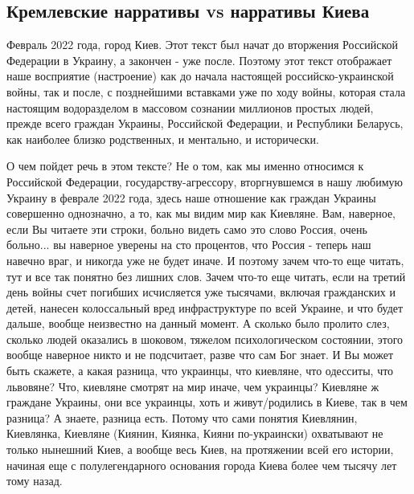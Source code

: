  
 
 
 
 

\subsection{Кремлевские нарративы vs нарративы Киева}

Февраль 2022 года, город Киев. Этот текст был начат до вторжения Российской
Федерации в Украину, а закончен - уже после. Поэтому этот текст отображает наше
восприятие (настроение) как до начала настоящей российско-украинской войны, так
и после, с позднейшими вставками уже по ходу войны, которая стала настоящим
водоразделом в массовом сознании миллионов простых людей, прежде всего граждан
Украины, Российской Федерации, и Республики Беларусь, как наиболее близко
родственных, и ментально, и исторически.

О чем пойдет речь в этом тексте? Не о том, как мы именно относимся к Российской
Федерации, государству-агрессору, вторгнувшемся в нашу любимую Украину в феврале 2022 года,
здесь наше отношение как граждан Украины совершенно однозначно, а то, как мы
видим мир как Киевляне. Вам, наверное, если Вы читаете эти строки, больно
видеть само это слово Россия, очень больно... вы наверное уверены на сто
процентов, что Россия - теперь наш навечно враг, и никогда уже не будет иначе.
И поэтому зачем что-то еще читать, тут и все так понятно без лишних слов. Зачем
что-то еще читать, если на третий день войны счет погибших исчисляется уже
тысячами, включая гражданских и детей, нанесен колоссальный вред инфраструктуре
по всей Украине, и что будет дальше, вообще неизвестно на данный момент.  А
сколько было пролито слез, сколько людей оказались в шоковом, тяжелом
психологическом состоянии, этого вообще наверное никто и не подсчитает, разве
что сам Бог знает. И Вы может быть скажете, а какая разница, что украинцы, что
киевляне, что одесситы, что львовяне? Что, киевляне смотрят на мир иначе, чем
украинцы?  Киевляне ж граждане Украины, они все украинцы, хоть и живут/родились в Киеве,
так в чем разница?  А знаете, разница есть. Потому что сами понятия Киевлянин,
Киевлянка, Киевляне (Киянин, Киянка, Кияни по-украински) охватывают не только
нынешний Киев, а вообще весь Киев, на протяжении всей его истории, начиная еще
с полулегендарного основания города Киева более чем тысячу лет тому назад.

